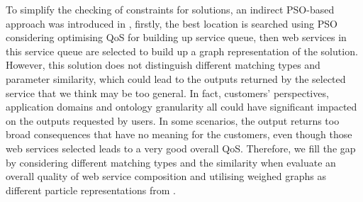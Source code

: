 \documentclass{llncs}
\begin{document}
To simplify the checking of constraints for solutions, an indirect PSO-based approach was introduced in \cite{da2016particle}, firstly, the best location is searched using PSO considering optimising QoS for building up service queue, then web services in this service queue are selected to build up a graph representation of the solution. However, this solution does not distinguish different matching types and parameter similarity, which could lead to the outputs returned by the selected service that we think may be too general. In fact, customers' perspectives, application domains and ontology granularity all could have significant impacted on the outputs requested by users. In some scenarios, the output returns too broad consequences that have no meaning for the customers, even though those web services selected leads to a very good overall QoS. Therefore, we fill the gap by considering different matching types and the similarity when evaluate an overall quality of web service composition and utilising weighed graphs as different particle representations from \cite{da2016particle}.
\end{document}
